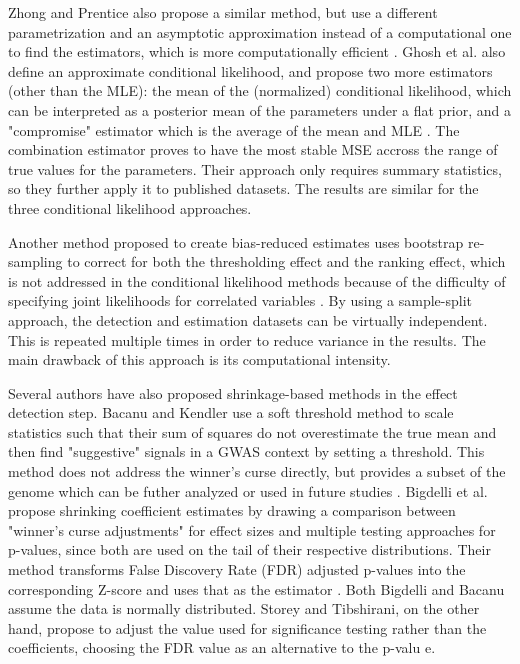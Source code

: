 \documentclass[AMA,STIX1COL]{WileyNJD-v2}\usepackage[]{graphicx}\usepackage[]{color}
\begin{document}
Zhong and Prentice also propose a similar method, but use a different parametrization and an asymptotic approximation instead of a computational one to find the estimators, which is more computationally efficient \cite{zhong2008bias}. Ghosh et al. also define an approximate conditional likelihood, and propose two more estimators (other than the MLE): the mean of the (normalized) conditional likelihood, which can be interpreted as a posterior mean of the parameters under a flat prior, and a "compromise" estimator which is the average of the mean and MLE \cite{ghosh2008estimating}. The combination estimator proves to have the most stable MSE accross the range of true values for the parameters. Their approach only requires summary statistics, so they further apply it to published datasets. The results are similar for the three conditional likelihood approaches.

Another method proposed to create bias-reduced estimates uses bootstrap re-sampling to correct for both the thresholding effect and the ranking effect, which is not addressed in the conditional likelihood methods because of the difficulty of specifying joint likelihoods for correlated variables \cite{sun2011br}. By using a sample-split approach, the detection and estimation datasets can be virtually independent. This is repeated multiple times in order to reduce variance in the results. The main drawback of this approach is its computational intensity.

Several authors have also proposed shrinkage-based methods in the effect detection step. Bacanu and Kendler use a soft threshold method to scale statistics such that their sum of squares do not overestimate the true mean and then find "suggestive" signals in a GWAS context by setting a threshold. This method does not address the winner's curse directly, but provides a subset of the genome which can be futher analyzed or used in future studies \cite{bacanu2013extracting}. Bigdelli et al. propose shrinking coefficient estimates by drawing a comparison between "winner's curse adjustments" for effect sizes and multiple testing approaches for p-values, since both are used on the tail of their respective distributions. Their method transforms False Discovery Rate (FDR) adjusted p-values into the corresponding Z-score and uses that as the estimator \cite{bigdeli2016simple}. Both Bigdelli and Bacanu assume the data is normally distributed. Storey and Tibshirani, on the other hand, propose to adjust the value used for significance testing rather than the coefficients, choosing the FDR value as an alternative to the p-valu e\cite{storey2003statistical}.
\end{document}

